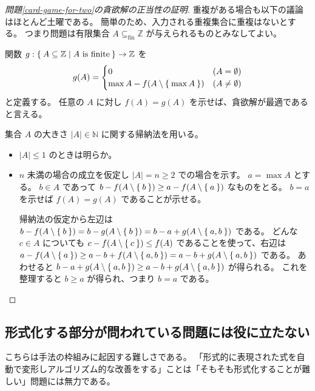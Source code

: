 \documentclass{ltjsarticle}
\begin{document}
\begin{proof}[問題\ref{card-game-for-two}の貪欲解の正当性の証明]
    重複がある場合も以下の議論はほとんど土曜である。
    簡単のため、入力される重複集合に重複はないとする。
    つまり問題は有限集合 $A \subseteq_\mathrm{fin} \mathbb{Z}$ が与えられるものとみなしてよい。

    関数 $g : \Set{ A \subseteq \mathbb{Z} \mid A \text{~is finite} } \to \mathbb{Z}$ を
    \[
        g(A) = \begin{cases}
            0 & (A = \emptyset) \\
            \max A - f(A \setminus \Set{ \max A }) & (A \ne \emptyset)
        \end{cases}
    \] と定義する。
    任意の $A$ に対し $f(A) = g(A)$ を示せば、貪欲解が最適であると言える。

    集合 $A$ の大きさ $\lvert A \rvert \in \mathbb{N}$ に関する帰納法を用いる。
    \begin{itemize}
        \item $\lvert A \rvert \le 1$ のときは明らか。
        \item $n$ 未満の場合の成立を仮定し $\lvert A \rvert = n \ge 2$ での場合を示す。
            $a = \max A$ とする。
            $b \in A$ であって $b - f(A \setminus \Set{ b }) \ge a - f(A \setminus \Set{ a })$ なものをとる。
            $b = a$ を示せば $f(A) = g(A)$ であることが示せる。

            帰納法の仮定から左辺は $b - f(A \setminus \Set{ b }) = b - g(A \setminus \Set{ b }) = b - a + g(A \setminus \Set{ a, b })$ である。
            どんな $c \in A$ についても $c - f(A \setminus \Set{ c }) \le f(A)$ であることを使って、右辺は $a - f(A \setminus \Set{ a }) \ge a - b + f(A \setminus \Set{ a, b }) = a - b + g(A \setminus \Set{ a, b })$ である。
            あわせると $b - a + g(A \setminus \Set{ a, b }) \ge a - b + g(A \setminus \Set{ a, b })$ が得られる。
            これを整理すると $b \ge a$ が得られ、つまり $b = a$ である。
    \end{itemize}
\end{proof}

\subsection{形式化する部分が問われている問題には役に立たない}

こちらは手法の枠組みに起因する難しさである。
「形式的に表現された式を自動で変形しアルゴリズム的な改善をする」ことは「そもそも形式化することが難しい」問題には無力である。
\end{document}
